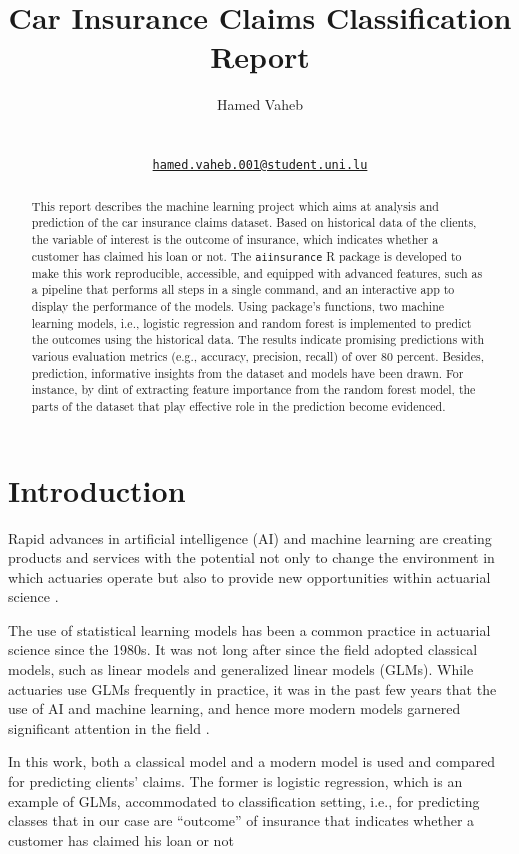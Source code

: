 \documentclass{article}
\title{Car Insurance Claims Classification Report}
\author{
    Hamed Vaheb
   \\
     \\
   \\
  \texttt{\href{mailto:hamed.vaheb.001@student.uni.lu}{\nolinkurl{hamed.vaheb.001@student.uni.lu}}} \\
  }
\begin{document}
\maketitle


\begin{abstract}
This report describes the machine learning project which aims at
analysis and prediction of the car insurance claims dataset. Based on
historical data of the clients, the variable of interest is the outcome
of insurance, which indicates whether a customer has claimed his loan or
not. The \texttt{aiinsurance} R package is developed to make this work
reproducible, accessible, and equipped with advanced features, such as a
pipeline that performs all steps in a single command, and an interactive
app to display the performance of the models. Using package's functions,
two machine learning models, i.e., logistic regression and random forest
is implemented to predict the outcomes using the historical data. The
results indicate promising predictions with various evaluation metrics
(e.g., accuracy, precision, recall) of over 80 percent. Besides,
prediction, informative insights from the dataset and models have been
drawn. For instance, by dint of extracting feature importance from the
random forest model, the parts of the dataset that play effective role
in the prediction become evidenced.
\end{abstract}


\hypertarget{introduction}{%
\section{Introduction}\label{introduction}}

Rapid advances in artificial intelligence (AI) and machine learning are
creating products and services with the potential not only to change the
environment in which actuaries operate but also to provide new
opportunities within actuarial science \cite{aiinins}.

The use of statistical learning models has been a common practice in
actuarial science since the 1980s. It was not long after since the field
adopted classical models, such as linear models and generalized linear
models (GLMs). While actuaries use GLMs frequently in practice, it was
in the past few years that the use of AI and machine learning, and hence
more modern models garnered significant attention in the field
\cite{rev1}.

In this work, both a classical model and a modern model is used and
compared for predicting clients' claims. The former is logistic
regression, which is an example of GLMs, accommodated to classification
setting, i.e., for predicting classes that in our case are ``outcome''
of insurance that indicates whether a customer has claimed his loan or
not
\end{document}
